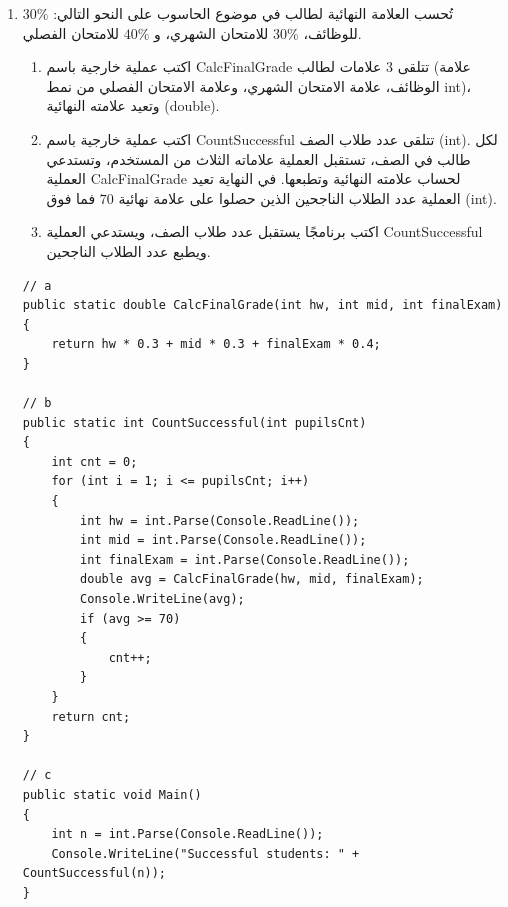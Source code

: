 \documentclass[14pt]{extarticle}
\begin{document}
\begin{enumerate}[resume, itemsep=2em]
\item
تُحسب العلامة النهائية لطالب في موضوع الحاسوب على النحو التالي: $30\%$ للوظائف، $30\%$ للامتحان الشهري، و $40\%$ للامتحان الفصلي.
\begin{enumerate}
    \item اكتب عملية خارجية باسم \textenglish{CalcFinalGrade} تتلقى $3$ علامات لطالب (علامة الوظائف، علامة الامتحان الشهري، وعلامة الامتحان الفصلي من نمط \textenglish{int})، وتعيد علامته النهائية (\textenglish{double}).
    \item اكتب عملية خارجية باسم \textenglish{CountSuccessful} تتلقى عدد طلاب الصف (\textenglish{int}). لكل طالب في الصف، تستقبل العملية علاماته الثلاث من المستخدم، وتستدعي العملية \textenglish{CalcFinalGrade} لحساب علامته النهائية وتطبعها. في النهاية تعيد العملية عدد الطلاب الناجحين الذين حصلوا على علامة نهائية $70$ فما فوق (\textenglish{int}).
    \item اكتب برنامجًا يستقبل عدد طلاب الصف، ويستدعي العملية \textenglish{CountSuccessful} ويطبع عدد الطلاب الناجحين.
\end{enumerate}
\ifwithsols
\begin{boxSolution}
\begin{english}
\begin{verbatim}
// a
public static double CalcFinalGrade(int hw, int mid, int finalExam)
{
    return hw * 0.3 + mid * 0.3 + finalExam * 0.4;
}

// b
public static int CountSuccessful(int pupilsCnt)
{
    int cnt = 0;
    for (int i = 1; i <= pupilsCnt; i++)
    {
        int hw = int.Parse(Console.ReadLine());
        int mid = int.Parse(Console.ReadLine());
        int finalExam = int.Parse(Console.ReadLine());
        double avg = CalcFinalGrade(hw, mid, finalExam);
        Console.WriteLine(avg);
        if (avg >= 70)
        {
            cnt++;
        }
    }
    return cnt;
}

// c
public static void Main()
{
    int n = int.Parse(Console.ReadLine());
    Console.WriteLine("Successful students: " + CountSuccessful(n));
}
\end{verbatim}
\end{english}
\end{boxSolution}
\fi
\filbreak

\end{enumerate}

\filbreak
\end{document}
